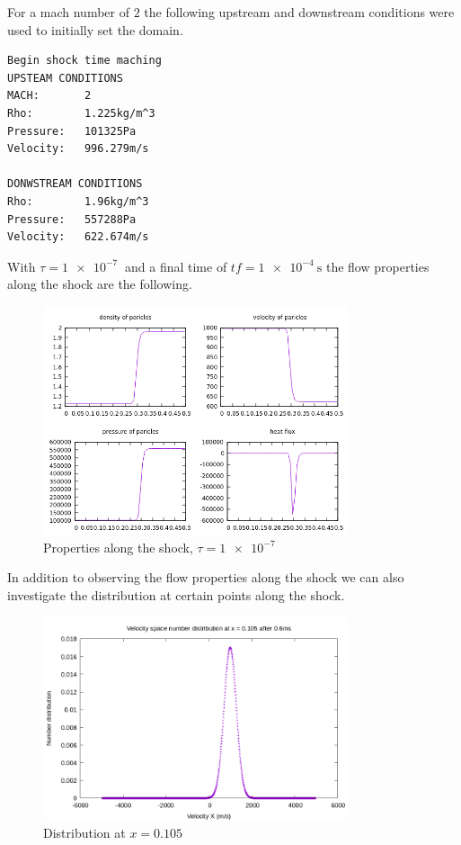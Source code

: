 \documentclass[paper=a4, fontsize=12pt]{scrartcl}
\begin{document}
For a mach number of $2$ the following upstream and downstream conditions were used to initially set the
domain.
\begin{center}
\begin{verbatim}
Begin shock time maching
UPSTEAM CONDITIONS
MACH:       2
Rho:        1.225kg/m^3
Pressure:   101325Pa
Velocity:   996.279m/s

DONWSTREAM CONDITIONS
Rho:        1.96kg/m^3
Pressure:   557288Pa
Velocity:   622.674m/s
\end{verbatim}
\end{center}
With $\tau = \SI{1e-7}{}$ and a final time of $tf = \SI{1e-4}{\second}$ the flow properties along the shock are the following.
\begin{figure}[H]
        \centering
        \includegraphics[width=0.8\textwidth]{mach-2-f}
        \caption{Properties along the shock, $\tau = \SI{1e-7}{}$ }
        \label{fig:mach-2-f}
\end{figure}
In addition to observing the flow properties along the shock we can also investigate the distribution
at certain points along the shock.
\begin{figure}[H]
        \centering
        \includegraphics[width=0.8\textwidth]{left_f-m}
        \caption{Distribution at $x=0.105$ }
        \label{fig:left_f-m}
\end{figure}
\end{document}
